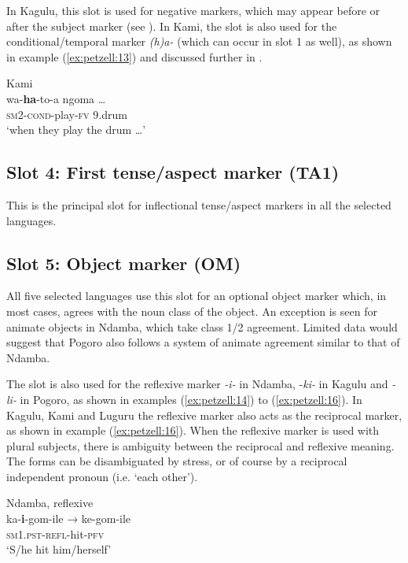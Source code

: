 \documentclass[output=paper,
            colorlinks, citecolor=brown
            ,draftmode
		  ]{langscibook}
\begin{document}
In Kagulu, this slot is used for negative markers, which may appear before or after the subject marker (see  ). In Kami, the slot is also used for the conditional/temporal marker \textit{(h)a-} (which can occur in slot 1 as well), as shown in example (\ref{ex:petzell:13}) and discussed further in  .


\ea\label{ex:petzell:13}Kami\\
\gll wa{{}-}\textbf{ha}{}-to-a       ngoma \ldots\\
\textsc{sm}2-\textsc{cond}{}-play-\textsc{fv}  9.drum\\
\glt `when they play the drum \ldots'
\z


\subsection{Slot 4: First tense/aspect marker (TA1)}\label{sec:petzell:2.4}

This is the principal slot for inflectional tense/aspect markers in all the selected languages.


\subsection{Slot 5: Object marker (OM)}\label{sec:petzell:2.5}

All five selected languages use this slot for an optional object marker which, in most cases, agrees with the noun class of the object. An exception is seen for animate objects in Ndamba, which take class 1/2 agreement. Limited data would suggest that Pogoro also follows a system of animate agreement similar to that of Ndamba.



The slot is also used for the reflexive marker \textit{{}-i-} in Ndamba, -\textit{ki-} in Kagulu and \textit{{}-li-} in Pogoro, as shown in examples (\ref{ex:petzell:14}) to (\ref{ex:petzell:16}). In Kagulu, Kami and Luguru the reflexive marker also acts as the reciprocal marker, as shown in example (\ref{ex:petzell:16}). When the reflexive marker is used with plural subjects, there is ambiguity between the reciprocal and reflexive meaning. The forms can be disambiguated by stress, or of course by a reciprocal independent pronoun (i.e. ‘each other’).


\ea\label{ex:petzell:14}Ndamba, reflexive\\
\gll ka-\textbf{i}{}-gom-ile {→} ke-gom-ile  \\
\textsc{sm}1.\textsc{pst}{}-\textsc{{refl}}{}-hit-\textsc{pfv}\\
\glt `S/he hit him/herself'
\end{document}
